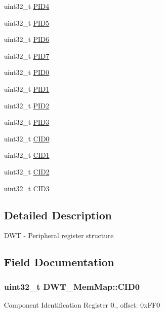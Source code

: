 \begin{DoxyCompactItemize}
\begin{tabbing}
\end{tabbing}\item 
uint32\+\_\+t \hyperlink{struct_d_w_t___mem_map_a6479f3227be2bba4bd2784301f522723}{P\+I\+D4}
\item 
uint32\+\_\+t \hyperlink{struct_d_w_t___mem_map_a8b21a1c5290151d5474deb51c391b85b}{P\+I\+D5}
\item 
uint32\+\_\+t \hyperlink{struct_d_w_t___mem_map_a7c3faa2d806e506a32d9d3283e3717c2}{P\+I\+D6}
\item 
uint32\+\_\+t \hyperlink{struct_d_w_t___mem_map_af0158099ec07706eef6138a50643e1c8}{P\+I\+D7}
\item 
uint32\+\_\+t \hyperlink{struct_d_w_t___mem_map_a822de5f73ae889eaedbe7ae65428b786}{P\+I\+D0}
\item 
uint32\+\_\+t \hyperlink{struct_d_w_t___mem_map_a3f93dbcfbf07c35986c4d989c0bde40e}{P\+I\+D1}
\item 
uint32\+\_\+t \hyperlink{struct_d_w_t___mem_map_a3feefc504238282fa83875bb6c754fd0}{P\+I\+D2}
\item 
uint32\+\_\+t \hyperlink{struct_d_w_t___mem_map_a121e1947f3f7b40e9dd704fe35cd39d2}{P\+I\+D3}
\item 
uint32\+\_\+t \hyperlink{struct_d_w_t___mem_map_aff62932c622d7a014e1a9be6c1ead135}{C\+I\+D0}
\item 
uint32\+\_\+t \hyperlink{struct_d_w_t___mem_map_a023bb3d410c13c5bd75ed9aedb0aed98}{C\+I\+D1}
\item 
uint32\+\_\+t \hyperlink{struct_d_w_t___mem_map_a79b7746489031d3b49004e1b2c400501}{C\+I\+D2}
\item 
uint32\+\_\+t \hyperlink{struct_d_w_t___mem_map_af719ff30fb65a86a545f97f5b556e0b9}{C\+I\+D3}
\end{DoxyCompactItemize}


\subsection{Detailed Description}
D\+W\+T -\/ Peripheral register structure 

\subsection{Field Documentation}
\hypertarget{struct_d_w_t___mem_map_aff62932c622d7a014e1a9be6c1ead135}{}
\subsubsection[{C\+I\+D0}]{\setlength{\rightskip}{0pt plus 5cm}uint32\+\_\+t D\+W\+T\+\_\+\+Mem\+Map\+::\+C\+I\+D0}\label{struct_d_w_t___mem_map_aff62932c622d7a014e1a9be6c1ead135}
Component Identification Register 0., offset\+: 0x\+F\+F0 \hypertarget{struct_d_w_t___mem_map_a023bb3d410c13c5bd75ed9aedb0aed98}{}
